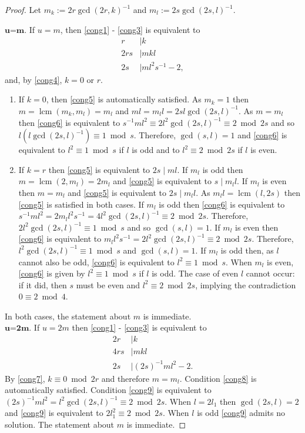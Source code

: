 \documentclass[12pt, a4paper]{article}
\newcommand{\opn}{\operatorname}
\newcommand{\Gcd}{\opn{gcd}}
\newcommand{\Lcm}{\opn{lcm}}
\begin{document}
\begin{proof}
  Let 
  $m_k := 2r \opn{gcd}(2r, k)^{-1}$ and
  $m_l := 2s \opn{gcd}(2s,l)^{-1}$.
  
  \noindent$\textbf{u=m.}$ 
  If $u=m$, then \eqref{cong1} - \eqref{cong3} is equivalent to 
  \begin{align}
    r & \mid k \label{cong4} \\
    2rs & \mid m k l \label{cong5} \\
    2s & \mid m l^2 s^{-1} - 2, \label{cong6}
  \end{align}
  and, by \eqref{cong4}, $k=0$ or $r$.
  \begin{enumerate}
  \item If $k = 0$, then \eqref{cong5} is automatically satisfied.
    As $m_k=1$ then $m=\Lcm(m_k, m_l)=m_l$ and $m l = m_l l =  2s l \Gcd(2s, l)^{-1}$.
As $m=m_l$ then \eqref{cong6} is equivalent to $s^{-1} m l^2 \equiv 2l^2 \Gcd(2s, l)^{-1} \equiv 2 \bmod{ 2s}$ and so $l(l \Gcd(2s, l)^{-1}) \equiv 1 \bmod{ s}$.
    Therefore, $\Gcd(s, l) = 1$ and \eqref{cong6} is equivalent to $l^2 \equiv 1 \bmod{ s}$ if $l$ is odd and to $l^2 \equiv 2 \bmod{ 2s}$ if $l$ is even.
  \item If $k= r$ then \eqref{cong5} is equivalent to $2s \mid ml$.
    If $m_l$ is odd then $m=\Lcm(2, m_l)=2 m_l$ and \eqref{cong5} is equivalent to $s \mid m_l l$. 
    If $m_l$ is even then $m=m_l$ and \eqref{cong5} is equivalent to $2s \mid m_l l$. 
    As $m_l l = \Lcm(l, 2s)$ then \eqref{cong5} is satisfied in both cases.
    If $m_l$ is odd then \eqref{cong6} is equivalent to $s^{-1}ml^2 = 2m_l l^2 s^{-1} = 4l^2 \Gcd(2s, l)^{-1} \equiv 2 \bmod{ 2s}$.
    Therefore, $2l^2 \Gcd(2s, l)^{-1} \equiv 1 \bmod{ s}$ and so $\Gcd(s, l)=1$.
    If $m_l$ is even then \eqref{cong6} is equivalent to $m_l l^2 s^{-1} = 2 l^2 \Gcd(2s, l)^{-1} \equiv 2 \bmod{ 2s}$.
    Therefore, $l^2 \Gcd(2s, l)^{-1} \equiv 1 \bmod{ s}$ and $\Gcd(s, l)=1$.
    If $m_l$ is odd then, as $l$ cannot also be odd, \eqref{cong6} is equivalent to $l^2 \equiv 1 \bmod{ s}$. 
    When $m_l$ is even, \eqref{cong6} is given by $l^2 \equiv 1 \bmod { s}$ if $l$ is odd.
    The case of  even $l$ cannot occur: 
    if it did, then $s$ must be even and $l^2 \equiv 2 \bmod{ 2s}$, implying the contradiction $0 \equiv 2 \bmod{ 4}$.
  \end{enumerate}
  In both cases, the statement about $m$ is immediate. \\   
  \noindent$\textbf{u=2m.}$
  If $u=2m$ then \eqref{cong1} - \eqref{cong3} is equivalent to
  \begin{align}
    2r  & \mid k \label{cong7} \\
    4rs & \mid m k l \label{cong8} \\
    2s  & \mid (2s)^{-1}ml^2 - 2. \label{cong9}
  \end{align}
  By \eqref{cong7}, $k \equiv 0 \bmod{ 2r}$ and therefore $m= m_l$. 
  Condition \eqref{cong8} is automatically satisfied.
  Condition \eqref{cong9} is equivalent to $(2s)^{-1}ml^2 = l^2 \Gcd(2s, l)^{-1} \equiv 2 \bmod{ 2s}$.
  When $l=2 l_1$ then $\Gcd(2s, l)=2$ and \eqref{cong9} is equivalent to $2l_1^2 \equiv 2 \bmod{ 2s}$.
  When $l$ is odd \eqref{cong9} admits no solution.
  The statement about $m$ is immediate.   
 \end{proof}
\end{document}
